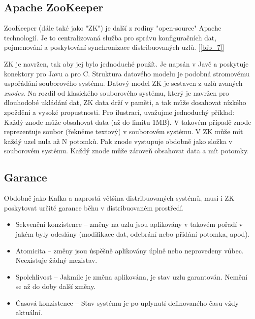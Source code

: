 \documentclass[
  digital, %
  table,   %
  nolof,     %
  nolot,     %
  oneside, %
  nocover,
  monochrome,
  12pt
]{fithesis3}
\begin{document}
\newpage
\subsection{Apache ZooKeeper}
\label{sec:zookeeper}
ZooKeeper (dále také jako "ZK") je další z rodiny "open-source" Apache technologií. Je to centralizovaná služba pro správu konfiguračních dat, pojmenování a poskytování synchronizace distribuovaných uzlů. [\ref{bib_7}]

ZK je navržen, tak aby jej bylo jednoduché použít. Je napsán v Javě a poskytuje konektory pro Javu a pro C. Struktura datového modelu je podobná stromovému uspořádání souborového systému. Datový model ZK je sestaven z uzlů zvaných \textit{znodes}. Na rozdíl od klasického souborového systému, který je navržen pro dlouhodobé ukládání dat, ZK data drží v paměti, a tak může dosahovat nízkého zpoždění a vysoké propustnosti. Pro ilustraci, uvažujme jednoduchý příklad: Každý znode může obsahovat data (až do limitu 1MB). V takovém případě znode reprezentuje soubor (řekněme textový) v souborovém systému. V ZK může mít každý uzel nula až N potomků. Pak znode vystupuje obdobně jako složka v souborovém systému. Každý znode může zároveň obsahovat data a mít potomky.

\subsection*{Garance}
Obdobně jako Kafka a naprostá většina distribuovaných systémů, musí i ZK poskytovat určité garance běhu v distribuovaném prostředí.

\begin{itemize}
  \item Sekvenční konzistence -- změny na uzlu jsou aplikovány v takovém pořadí v jakém byly odeslány (modifikace dat, odebrání nebo přidání potomka, apod).
  \item Atomicita -- změny jsou úspěšně aplikovány úplně nebo neprovedeny vůbec. Neexistuje žádný mezistav.
  \item Spolehlivost -- Jakmile je změna aplikována, je stav uzlu garantován. Nemění se až do doby další změny.
  \item Časová konzistence -- Stav systému je po uplynutí definovaného času vždy aktuální.
\end{itemize}
\end{document}
